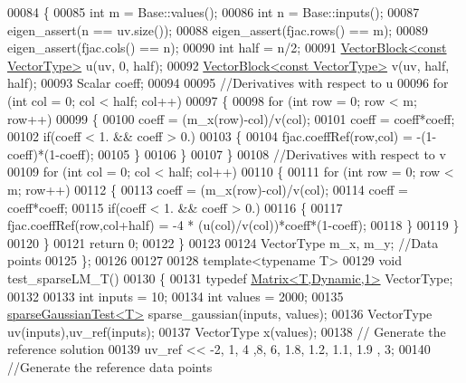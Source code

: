 \begin{DoxyCode}
00084   \{
00085     \textcolor{keywordtype}{int} m = Base::values(); 
00086     \textcolor{keywordtype}{int} n = Base::inputs();
00087     eigen\_assert(n == uv.size());
00088     eigen\_assert(fjac.rows() == m);
00089     eigen\_assert(fjac.cols() == n);
00090     \textcolor{keywordtype}{int} half = n/2;
00091     \hyperlink{group___core___module_class_eigen_1_1_vector_block}{VectorBlock<const VectorType>} u(uv, 0, half);
00092     \hyperlink{group___core___module_class_eigen_1_1_vector_block}{VectorBlock<const VectorType>} v(uv, half, half);
00093     Scalar coeff;
00094     
00095     \textcolor{comment}{//Derivatives with respect to u}
00096     \textcolor{keywordflow}{for} (\textcolor{keywordtype}{int} col = 0; col < half; col++)
00097     \{
00098       \textcolor{keywordflow}{for} (\textcolor{keywordtype}{int} row = 0; row < m; row++)
00099       \{
00100         coeff = (m\_x(row)-col)/v(col);
00101           coeff = coeff*coeff;
00102         \textcolor{keywordflow}{if}(coeff < 1. && coeff > 0.)
00103         \{
00104           fjac.coeffRef(row,col) = -(1-coeff)*(1-coeff);
00105         \}
00106       \}
00107     \}
00108     \textcolor{comment}{//Derivatives with respect to v}
00109     \textcolor{keywordflow}{for} (\textcolor{keywordtype}{int} col = 0; col < half; col++)
00110     \{
00111       \textcolor{keywordflow}{for} (\textcolor{keywordtype}{int} row = 0; row < m; row++)
00112       \{
00113         coeff = (m\_x(row)-col)/v(col);
00114         coeff = coeff*coeff;
00115         \textcolor{keywordflow}{if}(coeff < 1. && coeff > 0.)
00116         \{
00117           fjac.coeffRef(row,col+half) = -4 * (u(col)/v(col))*coeff*(1-coeff);
00118         \}
00119       \}
00120     \}
00121     \textcolor{keywordflow}{return} 0;
00122   \}
00123   
00124   VectorType m\_x, m\_y; \textcolor{comment}{//Data points}
00125 \};
00126 
00127 
00128 \textcolor{keyword}{template}<\textcolor{keyword}{typename} T>
00129 \textcolor{keywordtype}{void} test\_sparseLM\_T()
00130 \{
00131   \textcolor{keyword}{typedef} \hyperlink{group___core___module_class_eigen_1_1_matrix}{Matrix<T,Dynamic,1>} VectorType;
00132   
00133   \textcolor{keywordtype}{int} inputs = 10;
00134   \textcolor{keywordtype}{int} values = 2000;
00135   \hyperlink{structsparse_gaussian_test}{sparseGaussianTest<T>} sparse\_gaussian(inputs, values);
00136   VectorType uv(inputs),uv\_ref(inputs);
00137   VectorType x(values);
00138   \textcolor{comment}{// Generate the reference solution }
00139   uv\_ref << -2, 1, 4 ,8, 6, 1.8, 1.2, 1.1, 1.9 , 3;
00140   \textcolor{comment}{//Generate the reference data points}

\end{DoxyCode}
